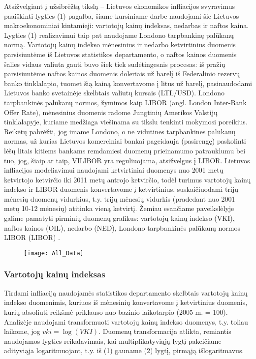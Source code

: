 \documentclass[a4paper]{article}
\begin{document}
Atsižvelgiant į užsibrėžtą tikslą – Lietuvos ekonomikos infliacijos svyravimus paaiškinti lygties (1) pagalba, šiame kursiniame darbe naudojami šie Lietuvos makroekonominiai kintamieji: vartotojų kainų indeksas, nedarbas ir naftos kaina. Lygties (1) realizavimui taip pat naudojame Londono tarpbankinę palūkanų normą. Vartotojų kainų indekso mėnesinius ir nedarbo ketvirtinius duomenis parsisiuntėme iš Lietuvos statistikos departamento, o naftos kainos duomenis šalies vidaus valiuta gauti buvo šiek tiek sudėtingesnis procesas: iš pražių parsisiuntėme naftos kainos duomenis doleriais už barelį iš Federalinio rezervų banko tinklalapio, tuomet šią kainą konvertavome į litus už barelį, pasinaudodami Lietuvos banko svetainėje skelbtais valiutų kursais (LTL/USD). Londono tarpbankinės palūkanų normos, žymimos kaip LIBOR (angl. London Inter-Bank Offer Rate), mėnesinius duomenis radome Jungtinių Amerikos Valstijų tinklalapyje, kuriame medžiaga viešinama su tikslu tenkinti mokymosi poreikius. Reikėtų pabrėžti, jog imame Londono, o ne vidutines tarpbankines palūkanų normas, už kurias Lietuvos komerciniai bankai pageidauja (pasirengę) paskolinti lėšų litais kitiems bankams remdamiesi duomenų prieinamumo patrauklumu bei tuo, jog, šiaip ar taip, VILIBOR yra reguliuojama, atsižvelgus į LIBOR. Lietuvos infliacijos modeliavimui naudojami ketvirtiniai duomenys nuo 2001 metų ketvirtojo ketvirčio iki 2011 metų antrojo ketvirčio, todėl turimus vartotojų kainų indekso ir LIBOR duomenis konvertavome į ketvirtinius, suskaičiuodami trijų mėnesių duomenų vidurkius, t.y. trijų mėnesių vidurkis (pradedant nuo 2001 metų 10-12 mėnesių) atitinka vieną ketvirtį. Žemiau esančiame paveikslėlyje galime pamatyti pirminių duomenų grafikus: vartotojų kainų indekso (VKI), naftos kainos (OIL), nedarbo (NED), Londono tarpbankinės palūkanų normos LIBOR (LIBOR) .
\begin{figure}[hc]
\centering
\texttt{[image: All\_Data]}
\caption{}
\end{figure}

\newpage \subsubsection{Vartotojų kainų indeksas} \indent

Tirdami infliaciją naudojamės statistikos departamento skelbtais vartotojų kainų indekso duomenimis, kuriuos iš mėnesinių konvertavome į ketvirtinius duomenis, kurių absoliuti reikšmė priklauso nuo bazinio laikotarpio (2005 m. = 100). Analizėje naudojami transformuoti vartotojų kainų indekso duomenys, t.y. toliau laikome, jog $\textit{vki} = \log(VKI)$. Duomenų transformacija atlikta, remiantis naudojamos lygties reikalavimais, kai multiplikatyviąją lygtį pakeičiame adityviąja logaritmuojant, t.y. iš (1) gauname (2) lygtį, pirmąją išlogaritmavus.
\end{document}

